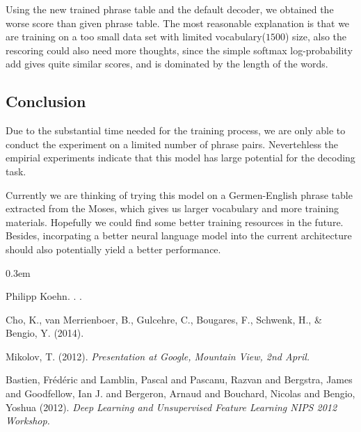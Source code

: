 \documentclass[11pt,letterpaper]{article}
\begin{document}
Using the new trained phrase table and the default decoder, we obtained the worse score than given phrase table. The most reasonable explanation is that we are training on a too small data set with limited vocabulary($1500$) size, also the rescoring could also need more thoughts, since the simple softmax log-probability add gives quite similar scores, and is dominated by the length of the words.

\subsection{Conclusion} %
\label{sub:evaluation} 
Due to the substantial time needed for the training process, we are only able to conduct the experiment on a limited number of phrase pairs. Nevertehless the empirial experiments indicate that this model has large potential for the decoding task. 

Currently we are thinking of trying this model on a Germen-English phrase table extracted from the Moses, which gives us larger vocabulary and more training materials. Hopefully we could find some better training resources in the future. Besides, incorpating a better neural language model into the current architecture should also potentially yield a better performance.

\begin{thebibliography}{} \itemsep 0.3em

Philipp Koehn.
.
.

Cho, K., van Merrienboer, B., Gulcehre, C., Bougares, F., Schwenk, H., \& Bengio, Y.
\newblock (2014).

Mikolov, T.
\newblock (2012).
\newblock \textit{Presentation at Google, Mountain View, 2nd April.}

Bastien, Fr{\'{e}}d{\'{e}}ric and Lamblin, Pascal and Pascanu, Razvan and Bergstra, James and Goodfellow, Ian J. and Bergeron, Arnaud and Bouchard, Nicolas and Bengio, Yoshua
\newblock (2012).
\newblock \textit{Deep Learning and Unsupervised Feature Learning NIPS 2012 Workshop.}

\end{thebibliography}
\end{document}
